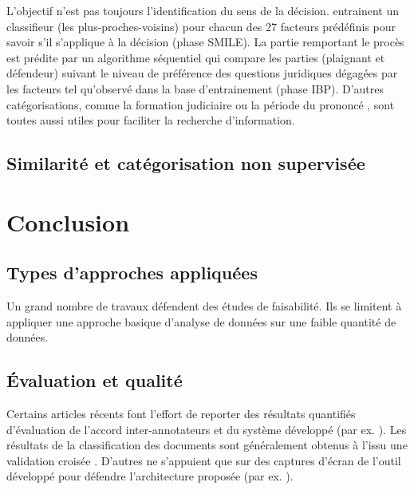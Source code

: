 L'objectif n'est pas toujours l'identification du sens de la décision. \cite{Ashley2009classifCases} entrainent un classifieur (les plus-proches-voisins) pour chacun des 27 facteurs prédéfinis pour savoir s'il s'applique à la décision (phase SMILE). La partie remportant le procès est prédite par un algorithme séquentiel qui compare les parties (plaignant et défendeur) suivant le niveau de préférence des questions juridiques dégagées par les facteurs tel qu'observé dans la base d'entrainement (phase IBP).  D'autres catégorisations, comme la formation judiciaire ou la période du prononcé \citep{Sulea2017predictareadecision,sulea2017legalEnsSVM}, sont toutes aussi utiles pour faciliter la recherche d'information.

\subsection{Similarité et catégorisation non supervisée}


\section{Conclusion}
\label{sec:literature:conclusion}
\subsection{Types d'approches appliquées}
Un grand nombre de travaux défendent des études de faisabilité. Ils se limitent à appliquer une approche basique d'analyse de données sur une faible quantité de données.


\subsection{Évaluation et qualité}
 Certains articles récents font l'effort de reporter des résultats quantifiés d'évaluation de l'accord inter-annotateurs et du système développé (par ex. \citep{Shulayeva2017recognfactprincip}). Les résultats de la classification des documents sont généralement obtenus à l'issu une validation croisée \cite{Sulea2017predictareadecision,sulea2017legalEnsSVM,Aletras2016predictDecisionECHR}. D'autres ne s'appuient que sur des captures d'écran de l'outil développé pour défendre l'architecture proposée (par ex. \citep{wyner2010extractlegalelts,Waltl2016lexia}).


